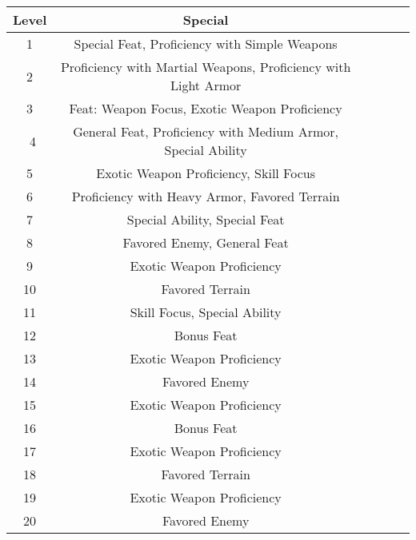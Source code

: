\documentclass[12pt]{article}
\begin{document}
\begin{tabular}{| c | c | c | c | c | p{4cm} |}

\hline
Level &  Special \\
\hline
1 & Special Feat, Proficiency with Simple Weapons \\
\hline
2 & Proficiency with Martial Weapons, Proficiency with Light Armor \\
\hline
3 & Feat: Weapon Focus, Exotic Weapon Proficiency \\
\hline\
4 & General Feat, Proficiency with Medium Armor, Special Ability \\
\hline
5 & Exotic Weapon Proficiency, Skill Focus \\
\hline
6 & Proficiency with Heavy Armor, Favored Terrain \\
\hline
7 & Special Ability, Special Feat \\
\hline
8 & Favored Enemy, General Feat \\
\hline
9 & Exotic Weapon Proficiency \\
\hline
10 & Favored Terrain \\
\hline
11 & Skill Focus, Special Ability \\
\hline
12 & Bonus Feat \\
\hline
13 & Exotic Weapon Proficiency \\
\hline
14 & Favored Enemy \\
\hline
15 & Exotic Weapon Proficiency \\
\hline
16 & Bonus Feat \\
\hline
17 & Exotic Weapon Proficiency \\
\hline
18 & Favored Terrain \\
\hline
19 & Exotic Weapon Proficiency \\
\hline
20 & Favored Enemy \\
\hline

\end{tabular}
\end{document}
